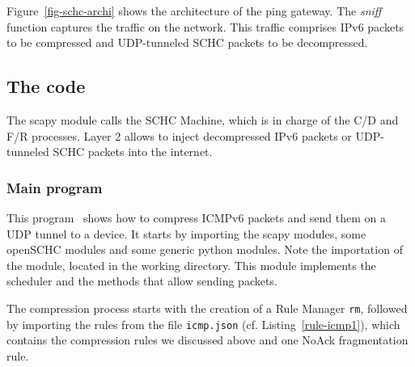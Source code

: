Figure~\vref{fig-schc-archi} shows the architecture of the ping gateway. The 
 \textit{sniff} function captures the traffic on the network. 
This traffic comprises IPv6 packets to be compressed and UDP-tunneled SCHC packets to be decompressed. 



\subsection{The code}
\label{sec-compr_code}


The scapy module calls the SCHC Machine, which is in charge of the C/D and F/R processes. Layer 2 allows to inject decompressed IPv6 packets or UDP-tunneled SCHC packets into the internet. 

\subsubsection{Main program}



This program~ shows how to compress ICMPv6 packets and send them on a UDP tunnel to a device. It starts by importing the scapy modules, some openSCHC modules and some generic python modules. Note the importation of the  module, located in the working directory. This module implements the scheduler and the methods that allow sending packets.


The compression process starts with the creation of a Rule Manager \texttt{rm}, followed by importing the rules from the file \texttt{icmp.json} (cf. Listing~\vref{rule-icmp1}), which contains the compression rules we discussed above and one NoAck fragmentation rule.


